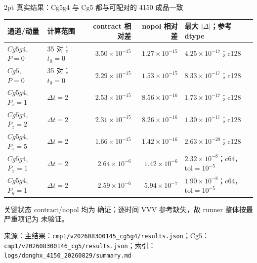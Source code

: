 \documentclass[UTF8,aspectratio=169,11pt]{ctexbeamer}
\newcommand{\source}[1]{\vspace{0.05em}\par{\raggedright\scriptsize\color{muted}来源：#1\par}}
\newcommand{\codepath}[1]{\nolinkurl{#1}}
\newcommand{\verified}{\textcolor{evidence}{确证}}
\newcommand{\unverified}{\textcolor{warning}{未验证}}
\begin{document}
\begin{frame}[t]{2pt 真实结果：Cg5g4 与 Cg5 都与可配对的 4150 成品一致}
  \footnotesize
  \setlength{\tabcolsep}{2.5pt}
  \renewcommand{\arraystretch}{1.02}
  \begin{tabularx}{0.96\textwidth}{@{}Y Y r r Y@{}}
    \toprule
    通道/动量 & 计算范围 & contract 相对差 & nopol 相对差 & 最大 $|\Delta|$；参考 dtype\\
    \midrule
    $Cg5g4$, $P=0$ & 35 对；$t_0=0$ & $3.50\times10^{-15}$ & $1.27\times10^{-15}$ & $4.25\times10^{-17}$；c128\\
    $Cg5$, $P=0$ & 35 对；$t_0=0$ & $2.29\times10^{-15}$ & $1.53\times10^{-15}$ & $8.33\times10^{-17}$；c128\\
    $Cg5g4$, $P_z=1$ & $\Delta t=2$ & $2.53\times10^{-15}$ & $8.56\times10^{-16}$ & $1.73\times10^{-17}$；c128\\
    $Cg5g4$, $P_z=2$ & $\Delta t=2$ & $2.31\times10^{-15}$ & $8.26\times10^{-16}$ & $1.30\times10^{-17}$；c128\\
    $Cg5g4$, $P_z=5$ & $\Delta t=2$ & $1.66\times10^{-15}$ & $1.42\times10^{-16}$ & $2.63\times10^{-20}$；c128\\
    $Cg5g4$, $P_x=1$ & $\Delta t=2$ & $2.64\times10^{-6}$ & $1.42\times10^{-6}$ & $2.32\times10^{-8}$；c64，$\mathrm{tol}=10^{-5}$\\
    $Cg5g4$, $P_y=1$ & $\Delta t=2$ & $2.59\times10^{-6}$ & $5.94\times10^{-7}$ & $1.90\times10^{-8}$；c64，$\mathrm{tol}=10^{-5}$\\
    \bottomrule
  \end{tabularx}
  \vspace{0.10em}
  \begin{block}{关键状态}
    contract/nopol 均为 \verified；逐时间 VVV 参考缺失，故 runner 整体按最严重项记为 \unverified。
  \end{block}
  \source{主结果：\codepath{cmp1/v202608300145_cg5g4/results.json}；Cg5：\codepath{cmp1/v202608300146_cg5/results.json}；索引：\codepath{logs/donghx_4150_20260829/summary.md}}
\end{frame}
\end{document}

